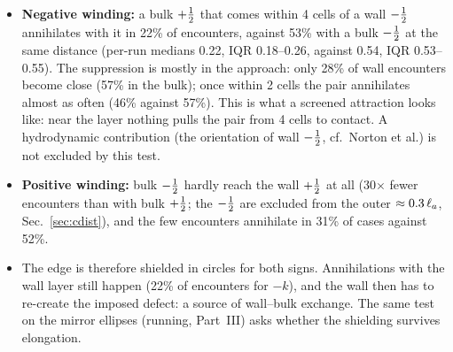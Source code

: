 \begin{itemize}
  \item \textbf{Negative winding:} a bulk $+\tfrac12$ that comes within 4 cells of a wall $-\tfrac12$ annihilates with it in 22\% of encounters,
        against 53\% with a bulk $-\tfrac12$ at the same distance (per-run medians 0.22, IQR 0.18--0.26, against 0.54, IQR 0.53--0.55). The
        suppression is mostly in the approach: only 28\% of wall encounters become close (57\% in the bulk); once within 2 cells the pair
        annihilates almost as often (46\% against 57\%). This is what a screened attraction looks like: near the layer nothing pulls the pair
        from 4 cells to contact. A hydrodynamic contribution (the orientation of wall $-\tfrac12$, cf.\ Norton et al.) is not excluded by this test.
  \item \textbf{Positive winding:} bulk $-\tfrac12$ hardly reach the wall $+\tfrac12$ at all (30$\times$ fewer encounters than with bulk $+\tfrac12$; the
        $-\tfrac12$ are excluded from the outer $\approx0.3\,\ell_a$, Sec.~\ref{sec:cdist}), and the few encounters annihilate in 31\% of cases
        against 52\%.
  \item The edge is therefore shielded in circles for both signs. Annihilations with the wall layer still happen (22\% of encounters for
        $-k$), and the wall then has to re-create the imposed defect: a source of wall--bulk exchange. The same test on the mirror ellipses
        (running, Part~III) asks whether the shielding survives elongation.
\end{itemize}
